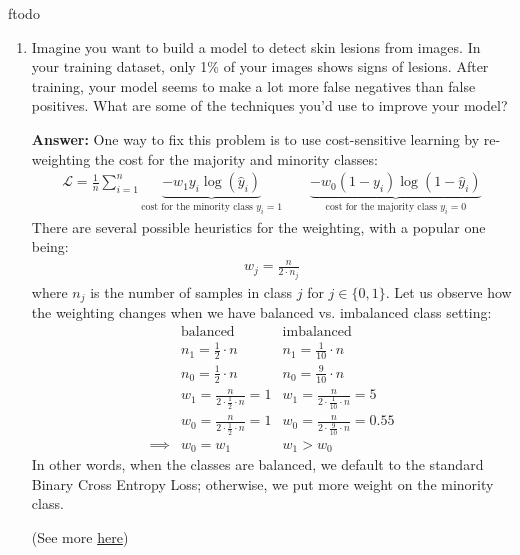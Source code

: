 ƒtodo\documentclass{article}
\newenvironment{QandA}{\begin{enumerate}[label=\arabic*.]}{\end{enumerate}}
\newenvironment{InnerQandA}{\begin{enumerate}[label=\roman*.]}{\end{enumerate}}
\newenvironment{answer}{\par\normalfont \textbf{Answer:}}{}
\begin{document}
\begin{QandA}
\begin{InnerQandA}
        \item Imagine you want to build a model to detect skin lesions from images. In your training dataset, only 1\% of your images shows signs of lesions. After training, your model seems to make a lot more false negatives than false positives. What are some of the techniques you'd use to improve your model?
        \begin{answer}
            One way to fix this problem is to use cost-sensitive learning by re-weighting the cost for the majority and minority classes:
            \begin{align*}
                \mathcal{L} = \frac{1}{n} \sum_{i=1}^n \underbrace{-w_1 y_i \log (\hat{y}_i)}_{\text{cost for the minority class } y_i = 1} \quad \quad \underbrace{-w_0(1 - y_i)\log(1 - \hat{y}_i)}_{\text{cost for the majority class } y_i = 0}
            \end{align*}
            There are several possible heuristics for the weighting, with a popular one being:
            \begin{align*}
                w_j = \frac{n}{2 \cdot n_j}
            \end{align*}
            where $n_j$ is the number of samples in class $j$ for $j \in \{0, 1\}$. Let us observe how the weighting changes when we have balanced vs. imbalanced class setting:
            \begin{align*}
                &\text{balanced} &\text{imbalanced} \\
                &n_1 = \frac{1}{2}\cdot n &n_1 = \frac{1}{10} \cdot n \\
                &n_0 = \frac{1}{2} \cdot n & n_0 = \frac{9}{10} \cdot n \\
                &w_1 = \frac{n}{2 \cdot \frac{1}{2} \cdot n} = 1 &w_1 = \frac{n}{2 \cdot \frac{1}{10} \cdot n} = 5 \\
                &w_0 = \frac{n}{2 \cdot \frac{1}{2}\cdot n} = 1 &w_0 = \frac{n}{2 \cdot \frac{9}{10} \cdot n} = 0.55 \\
                \implies &w_0 = w_1 &w_1 > w_0
            \end{align*}
            In other words, when the classes are balanced, we default to the standard Binary Cross Entropy Loss; otherwise, we put more weight on the minority class.

            (See more \href{https://www.youtube.com/watch?v=vJkWB_kmadQ&ab_channel=Dr.DataScience}{here})
        \end{answer}
    \end{InnerQandA}


\end{QandA}
\end{document}
